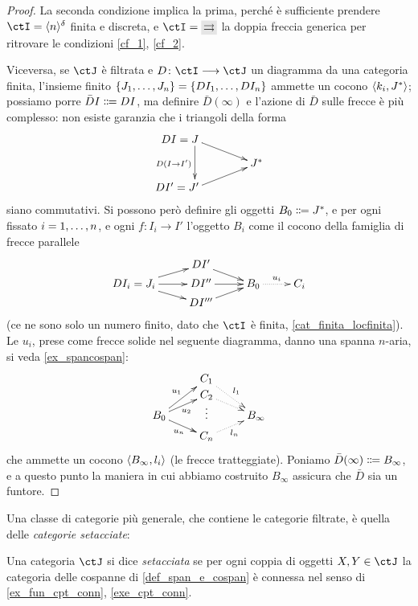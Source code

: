\begin{proof}
 La seconda condizione implica la prima, perché è sufficiente prendere \(\ctI=\bkt{n}^\delta\) finita e discreta, e \(\ctI=\genAArrow\) la doppia freccia generica per ritrovare le condizioni \ref{cf_1}, \ref{cf_2}.

 Viceversa, se \(\ctJ\) è filtrata e \(D \colon \ctI \fun\ctJ\) un diagramma da una categoria finita, l'insieme finito \(\{\tup Jn,\}=\{DI_1,\dots, DI_n\}\) ammette un cocono \(\langle k_i,J^*\rangle\); possiamo porre \(\bar D I \defeq  DI\), ma definire \(\bar D (\infty)\) e l'azione di \(\bar D\) sulle frecce è più complesso: non esiste garanzia che i triangoli della forma
 \[\xymatrix@R=3mm{
  **[l] DI=J\ar[dr]\ar[dd]_{D(I\to I')} \\
  &J^* \\
  **[l] DI'=J'\ar[ur]
  }\]
 siano commutativi. Si possono però definire gli oggetti \(B_0 \defeq  J^*\), e per ogni fissato \(i=\iter n\), e ogni \(f \colon I_i \to I'\) l'oggetto \(B_i\) come il cocono della famiglia di frecce parallele
 \[\xymatrix@R=1mm{
  &DI'\ar[dr]&\\
  DI_i = J_i\ar[ur]\ar[r]\ar[dr]& DI''\ar[r]& B_0 \ar@{.>}[r]^-{u_i} & C_i\\
  &DI'''\ar[ur]&
  }\]
 (ce ne sono solo un numero finito, dato che \(\ctI\) è finita, \ref{cat_finita_locfinita}). Le \(u_i\), prese come frecce solide nel seguente diagramma, danno una spanna \(n\)-aria, si veda \ref{ex_spancospan}:
 \[\xymatrix@R=0mm{
  & C_1\ar@{.>}[ddr]^{l_1}\\
  & C_2\ar@{.>}[dr]\\
  B_0 \ar[uur]^-{u_1}\ar[ur]_{u_2}\ar[dr]_-{u_n} & \vdots & B_\infty\\
  & C_n\ar@{.>}[ur]_{l_n}
  }\]
 che ammette un cocono \(\langle B_\infty,l_i\rangle\) (le frecce tratteggiate). Poniamo \(\bar D(\infty) \defeq  B_\infty\), e a questo punto la maniera in cui abbiamo costruito \(B_\infty\) assicura che \(\bar D\) sia un funtore.
\end{proof}
Una classe di categorie più generale, che contiene le categorie filtrate, è quella delle \emph{categorie setacciate}:
\begin{definition}\label{def_cat_setacciata}
 Una categoria \(\ctJ\) si dice \emph{setacciata} se per ogni coppia di oggetti \(X,Y\in\ctJ\) la categoria delle cospanne di \ref{def_span_e_cospan} è connessa nel senso di \ref{ex_fun_cpt_conn}, \ref{exe_cpt_conn}.
\end{definition}
